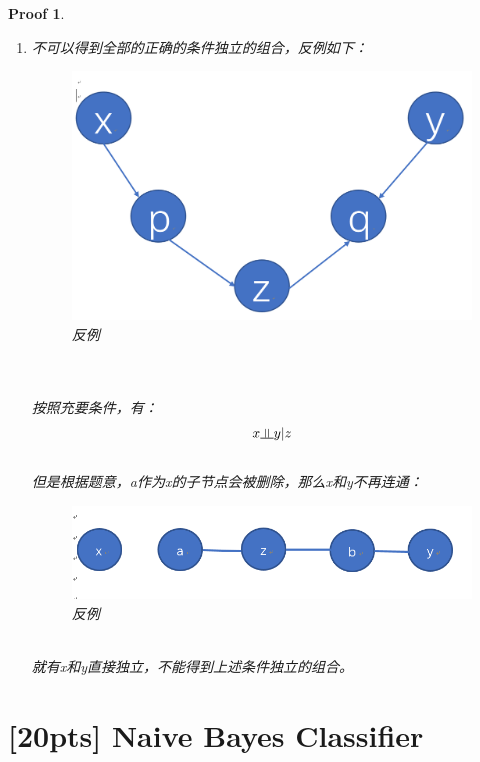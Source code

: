 \documentclass[a4paper,UTF8]{article}
\numberwithin{equation}{section}
\newtheorem*{myProof}{Proof}
\newcommand{\indep}{\rotatebox[origin=c]{90}{$\models$}}
\begin{document}
\begin{myProof}
\begin{enumerate}[(1)]
\begin{equation}
\begin{aligned}
&B \indep E | A,D
\end{aligned}
\end{equation}
\item 
不可以得到全部的正确的条件独立的组合，反例如下：
\begin{figure}[!ht]
	\centering
	\includegraphics[scale=0.5]{bayes.png}
	\caption{反例}
	\label{fig:label2}
\end{figure}\\\\
按照充要条件，有：
\begin{equation}
x \indep y | z
\end{equation}
\\
但是根据题意，a作为x的子节点会被删除，那么x和y不再连通：\\
\begin{figure}[!ht]
	\centering
	\includegraphics[scale=0.5]{bayes2.png}
	\caption{反例}
	\label{fig:label3}
\end{figure}\\
就有x和y直接独立，不能得到上述条件独立的组合。\\
\end{enumerate}
\end{myProof}
\newpage
\section{[20pts] Naive Bayes Classifier}
	
\end{document}
